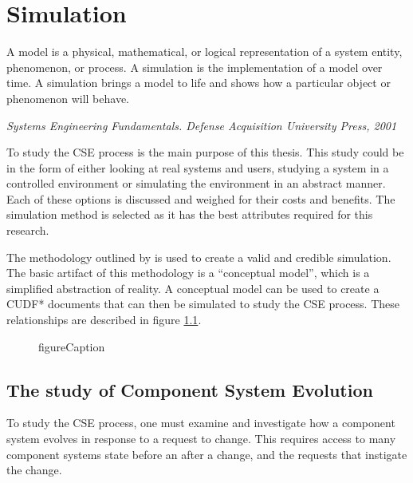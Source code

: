 \chapter{Simulation}
\label{simulation}
\epigraph{A model is a physical, mathematical, or logical representation of a system entity, phenomenon, or process. 
A simulation is the implementation of a model over time. 
A simulation brings a model to life and shows how a particular object or phenomenon will behave.}
{\textit{Systems Engineering Fundamentals. Defense Acquisition University Press, 2001}}

To study the CSE process is the main purpose of this thesis.
This study could be in the form of either looking at real systems and users, studying a system in a controlled environment or simulating the environment in an abstract manner.
Each of these options is discussed and weighed for their costs and benefits.
The simulation method is selected as it has the best attributes required for this research.

The methodology outlined by \cite{Law2005} is used to create a valid and credible simulation.
The basic artifact of this methodology is a ``conceptual model'', which is a simplified abstraction of reality.
A conceptual model can be used to create a CUDF* documents that can then be simulated to study the CSE process.
These relationships are described in figure \ref{sim.modeldiagram}.



\begin{figure}[htp]
\begin{center}
  \caption[labelInTOC]{figureCaption}
  \label{sim.modeldiagram}
\end{center}
\end{figure}



\section{The study of Component System Evolution}
To study the CSE process, one must examine and investigate how a component system evolves in response to a request to change. 
This requires access to many component systems state before an after a change, and the requests that instigate the change.

